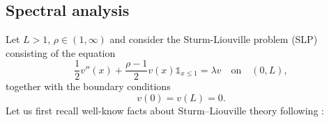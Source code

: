 \documentclass[11pt]{article}
\theoremstyle{plain}
\begin{document}
\subsection{Spectral analysis}\label{sec:spec}



Let $L>1, \, \rho\in (1,\infty)$ and consider the Sturm-Liouville problem (SLP) consisting of the equation 
\begin{equation}
\frac{1}{2}v''(x)+\frac{\rho-1}{2} v(x)\mathbb{1}_{x\leqslant 1}=\lambda v \quad \text{on} \quad  (0,L),\tag{E}
\label{eq:defT}
\end{equation}
together with the boundary conditions
\begin{equation}\tag{BC}\label{bc}
v(0)=v(L)=0.
\end{equation}
Let us first recall well-know facts about Sturm--Liouville theory following \cite[Section 4.6]{Zettl:2010aa}:
\end{document}
